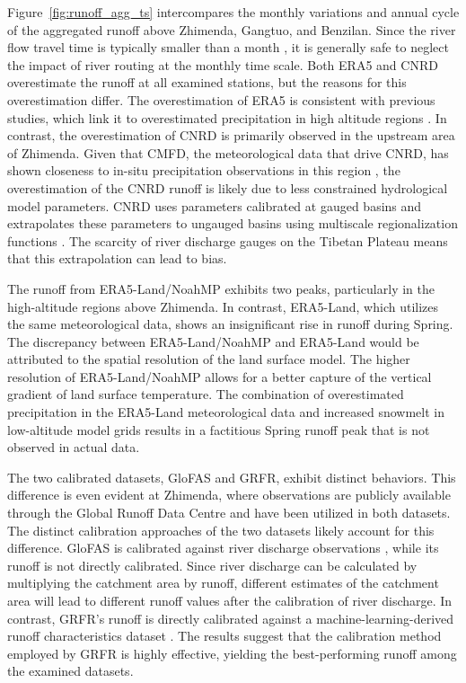 \documentclass[preprint, review, authoryear, longtitle, 12pt, 3p]{elsarticle}
\begin{document}
Figure~\ref{fig:runoff_agg_ts} intercompares the monthly variations and annual cycle of the aggregated runoff above Zhimenda, Gangtuo, and Benzilan. Since the river flow travel time is typically smaller than a month \citep{allen2018GRL}, it is generally safe to neglect the impact of river routing at the monthly time scale. Both ERA5 and CNRD overestimate the runoff at all examined stations, but the reasons for this overestimation differ. The overestimation of ERA5 is consistent with previous studies, which link it to overestimated precipitation in high altitude regions \citep{bian2019JHM, bian2020JGRA, sun2021ERL, wang2024RS}. In contrast, the overestimation of CNRD is primarily observed in the upstream area of Zhimenda. Given that CMFD, the meteorological data that drive CNRD, has shown closeness to in-situ precipitation observations in this region \citep{wang2024RS}, the overestimation of the CNRD runoff is likely due to less constrained hydrological model parameters. CNRD uses parameters calibrated at gauged basins and extrapolates these parameters to ungauged basins using multiscale regionalization functions \citep{gou2021BAMS, miao2022CSB}. The scarcity of river discharge gauges on the Tibetan Plateau means that this extrapolation can lead to bias.

The runoff from ERA5-Land/NoahMP exhibits two peaks, particularly in the high-altitude regions above Zhimenda. In contrast, ERA5-Land, which utilizes the same meteorological data, shows an insignificant rise in runoff during Spring. The discrepancy between ERA5-Land/NoahMP and ERA5-Land would be attributed to the spatial resolution of the land surface model. The higher resolution of ERA5-Land/NoahMP allows for a better capture of the vertical gradient of land surface temperature. The combination of overestimated precipitation in the ERA5-Land meteorological data and increased snowmelt in low-altitude model grids \citep{barnhart2024WRR} results in a factitious Spring runoff peak that is not observed in actual data.

The two calibrated datasets, GloFAS and GRFR, exhibit distinct behaviors. This difference is even evident at Zhimenda, where observations are publicly available through the Global Runoff Data Centre and have been utilized in both datasets. The distinct calibration approaches of the two datasets likely account for this difference. GloFAS is calibrated against river discharge observations \citep{hirpa2018JH}, while its runoff is not directly calibrated. Since river discharge can be calculated by multiplying the catchment area by runoff, different estimates of the catchment area will lead to different runoff values after the calibration of river discharge. In contrast, GRFR's runoff is directly calibrated against a machine-learning-derived runoff characteristics dataset \citep{yang2019WRR}. The results suggest that the calibration method employed by GRFR is highly effective, yielding the best-performing runoff among the examined datasets.
\end{document}
